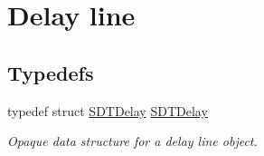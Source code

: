 \hypertarget{group__delay}{}\section{Delay line}
\label{group__delay}
\subsection*{Typedefs}
\begin{DoxyCompactItemize}
\item 
\hypertarget{group__delay_gad32f7855edcb8049b7666b2e27cfd6b5}{}typedef struct \hyperlink{group__delay_gad32f7855edcb8049b7666b2e27cfd6b5}{S\+D\+T\+Delay} \hyperlink{group__delay_gad32f7855edcb8049b7666b2e27cfd6b5}{S\+D\+T\+Delay}\label{group__delay_gad32f7855edcb8049b7666b2e27cfd6b5}

\begin{DoxyCompactList}\small\item\em Opaque data structure for a delay line object. \end{DoxyCompactList}\end{DoxyCompactItemize}
